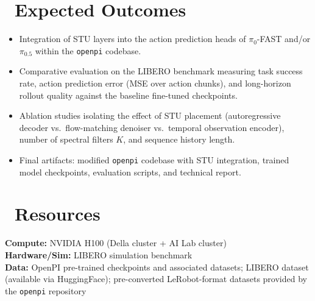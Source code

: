\documentclass[10pt, letterpaper]{article}
\begin{document}
\section*{\faCheckCircle\ Expected Outcomes}
\begin{itemize}[leftmargin=1.5em, nosep]
    \item Integration of STU layers into the action prediction heads of $\pi_0$-FAST and/or $\pi_{0.5}$ within the \texttt{openpi} codebase.
    \item Comparative evaluation on the LIBERO benchmark measuring task success rate, action prediction error (MSE over action chunks), and long-horizon rollout quality against the baseline fine-tuned checkpoints.
    \item Ablation studies isolating the effect of STU placement (autoregressive decoder vs.\ flow-matching denoiser vs.\ temporal observation encoder), number of spectral filters $K$, and sequence history length.
    \item Final artifacts: modified \texttt{openpi} codebase with STU integration, trained model checkpoints, evaluation scripts, and technical report.
\end{itemize}

\section*{\faCogs\ Resources}
\textbf{Compute:} NVIDIA H100 (Della cluster + AI Lab cluster) \\
\textbf{Hardware/Sim:} LIBERO simulation benchmark \\
\textbf{Data:} OpenPI pre-trained checkpoints and associated datasets; LIBERO dataset (available via HuggingFace); pre-converted LeRobot-format datasets provided by the \texttt{openpi} repository

\end{document}
